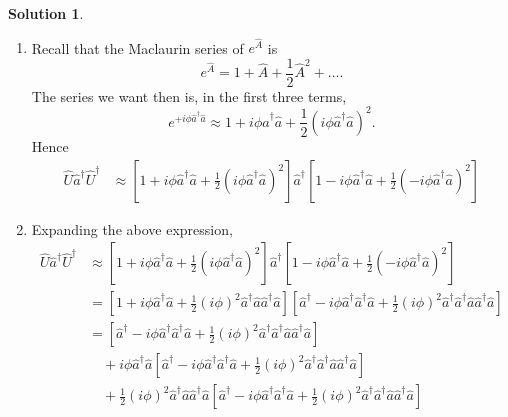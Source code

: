 \documentclass[10pt]{article}
\theoremstyle{definition}
\newtheorem{soln}{Solution}
\begin{document}
\begin{soln}
  \begin{enumerate}[label=(\alph*)]
    \item Recall that the Maclaurin series of $e^{\hat{A}}$ is
          $$e^{\hat{A}}=1+\hat{A}+\frac{1}{2}\hat{A}^2+\dots.$$
          The series we want then is, in the first three terms,
          $$e^{+i\phi\hat{a}^\dagger\hat{a}}\approx 1+i\phi\hat{a}^\dagger\hat{a}+\frac{1}{2}\left(i\phi\hat{a}^\dagger\hat{a}\right)^2.$$
          Hence
          \begin{align*}
            \hat{U}\hat{a}^\dagger\hat{U}^\dagger & \approx \left[1+i\phi\hat{a}^\dagger\hat{a}+\frac{1}{2}\left(i\phi\hat{a}^\dagger\hat{a}\right)^2\right]\hat{a}^\dagger\left[1-i\phi\hat{a}^\dagger\hat{a}+\frac{1}{2}\left(-i\phi\hat{a}^\dagger\hat{a}\right)^2\right]
          \end{align*}
    \item Expanding the above expression,
          \begin{align*}
            \hat{U}\hat{a}^\dagger\hat{U}^\dagger & \approx \left[1+i\phi\hat{a}^\dagger\hat{a}+\frac{1}{2}\left(i\phi\hat{a}^\dagger\hat{a}\right)^2\right]\hat{a}^\dagger\left[1-i\phi\hat{a}^\dagger\hat{a}+\frac{1}{2}\left(-i\phi\hat{a}^\dagger\hat{a}\right)^2\right]                                             \\
                                                  & = \left[1+i\phi\hat{a}^\dagger\hat{a}+\frac{1}{2}(i\phi)^2\hat{a}^\dagger\hat{a}\hat{a}^\dagger\hat{a}\right]\left[\hat{a}^\dagger-i\phi\hat{a}^\dagger\hat{a}^\dagger\hat{a}+\frac{1}{2}(i\phi)^2\hat{a}^\dagger\hat{a}^\dagger\hat{a}\hat{a}^\dagger\hat{a}\right] \\
                                                  & = \left[\hat{a}^\dagger-i\phi\hat{a}^\dagger\hat{a}^\dagger\hat{a}+\frac{1}{2}(i\phi)^2\hat{a}^\dagger\hat{a}^\dagger\hat{a}\hat{a}^\dagger\hat{a}\right]                                                                                                            \\
                                                  & \quad +i\phi\hat{a}^\dagger\hat{a}\left[\hat{a}^\dagger-i\phi\hat{a}^\dagger\hat{a}^\dagger\hat{a}+\frac{1}{2}(i\phi)^2\hat{a}^\dagger\hat{a}^\dagger\hat{a}\hat{a}^\dagger\hat{a}\right]                                                                            \\
                                                  & \quad +\frac{1}{2}(i\phi)^2\hat{a}^\dagger\hat{a}\hat{a}^\dagger\hat{a}\left[\hat{a}^\dagger-i\phi\hat{a}^\dagger\hat{a}^\dagger\hat{a}+\frac{1}{2}(i\phi)^2\hat{a}^\dagger\hat{a}^\dagger\hat{a}\hat{a}^\dagger\hat{a}\right]                                       \\

\end{align*}
\end{enumerate}
\end{soln}
\end{document}
